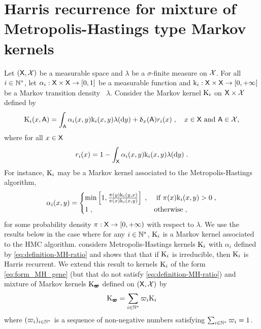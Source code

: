 \section{Harris recurrence for mixture of Metropolis-Hastings type Markov kernels}
\label{sec:harr-recurr-metr}
Let $(\mathsf{X},\mathcal{X})$ be a measurable space and $\lambda$ be a
$\sigma$-finite measure on $\mathcal{X}$.  For all $i \in \mathbb{N}^*$,
let $\alpha_i: \mathsf{X} \times \mathsf{X} \to \left[0,1\right]$ be a measurable function and   $\mathrm{k}_i : \mathsf{X}
\times \mathsf{X} \to \left[0,+\infty\right]$ be a Markov transition density \wrt\ $\lambda$. Consider the Markov kernel
$\mathrm{K}_i$ on $\mathsf{X} \times \mathcal{X}$ defined by
\begin{equation}
  \label{eq:form_MH_gene}
  \mathrm{K}_i(x,\mathsf{A}) = \int_{\mathsf{A}} \alpha_i(x,y) \mathrm{k}_i(x,y) \lambda(\mathrm{d} y ) + \updelta_x(\mathsf{A}) r_i(x) \;, \quad  \text{$x \in \mathsf{X}$  and $\mathsf{A} \in \mathcal{X}$,}
\end{equation}
where for all $x
\in \mathsf{X}$
\begin{equation}
  \label{eq:def_r_i_harris_tierney}
  r_i(x) = 1 - \int_{\mathsf{X}} \alpha_i(x,y) \mathrm{k}_i(x,y) \lambda(\mathrm{d} y ) \;.
\end{equation}
For instance,  $\mathrm{K}_i$ may be a Markov kernel associated to the Metropolis-Hastings
algorithm, \ie
\begin{equation}
\label{eq:definition-MH-ratio}
  \alpha_i(x,y) =
  \begin{cases}
\min\left[ 1, \frac{\pi(y) \mathrm{k}_i(y,x)}{\pi(x) \mathrm{k}_i(x,y)} \right] \;, & \text{ if } \pi(x) \mathrm{k}_i(x,y) >0 \;,\\
1\;, & \text{otherwise} \;,
  \end{cases}
\end{equation}
for some probability density $\pi: \mathsf{X} \to \left[0,+\infty\right)$
with respect to $\lambda$.
We use the results below in the case
where for any $i \in \mathbb{N}^{*}$, $\mathrm{K}_i$ is a Markov kernel associated to the HMC algorithm.
\cite[Corollary 2]{tierney:1994}
considers Metropolis-Hastings kernels $\mathrm{K}_i$ with $\alpha_i$ defined by \eqref{eq:definition-MH-ratio} and shows that that if $\mathrm{K}_i$ is irreducible, then $\mathrm{K}_i$ is Harris recurrent. We extend this
result to kernels $\mathrm{K}_i$ of the form \eqref{eq:form_MH_gene} (but that do not satisfy \eqref{eq:definition-MH-ratio}) and  mixture of Markov kernels $\mathrm{K}_{\pmb{\varpi}}$ defined on
$(\mathsf{X}, \mathcal{X})$ by
\begin{equation}
\label{eq:mixture_kernel_Harris}
  \mathrm{K}_{\pmb{\varpi}} = \sum_{i \in \mathbb{N}^*} \varpi_i \mathrm{K}_i
\end{equation}
where $(\varpi_i)_{i\in
  \mathbb{N}^*}$ is a sequence of non-negative numbers satisfying $\sum_{i
  \in \mathbb{N}^*} \varpi_i = 1$.


